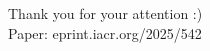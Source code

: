 \documentclass{beamer}
\begin{document}
\begin{frame}
    \begin{center}
    
    Thank you for your attention :)
        \\
        \vspace{3em}
    Paper: eprint.iacr.org/2025/542        
    \end{center}

\end{frame}
\end{document}
